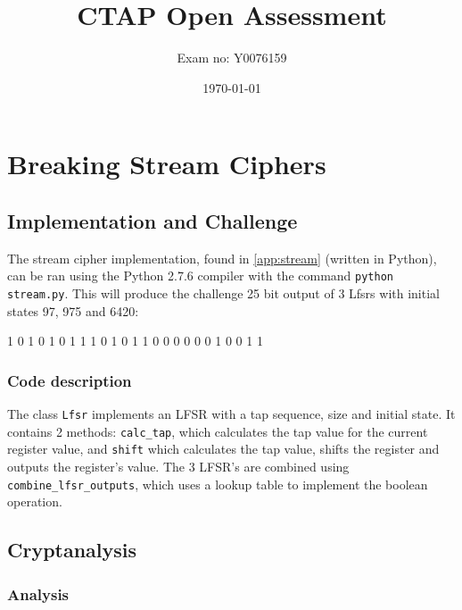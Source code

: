 \documentclass[british,10pt,a4paper]{article}
\begin{document}
\title{CTAP Open Assessment}
\author{Exam no: Y0076159}
\date{\today}
\maketitle
\tableofcontents
\clearpage
\section{Breaking Stream Ciphers}
\subsection{Implementation and Challenge}
The stream cipher implementation, found in \autoref{app:stream} (written in Python),
can be ran using the Python 2.7.6 compiler with the command \lstinline{python stream.py}. This will produce the
challenge 25 bit output of 3 Lfsrs with initial states 97, 975 and 6420:

1 0 1 0 1 0 1 1 1 0 1 0 1 1 0 0 0 0 0 0 1 0 0 1 1

\subsubsection{Code description}
The class \lstinline{Lfsr} implements an LFSR with a tap sequence, size and initial state. It contains 2 methods:
\lstinline{calc_tap}, which calculates the tap value for the current register value, and \lstinline{shift} which
calculates the tap value, shifts the register and outputs the register's value. The 3 LFSR's are combined using
\lstinline{combine_lfsr_outputs}, which uses a lookup table to implement the boolean operation.

\subsection{Cryptanalysis}
\subsubsection{Analysis}
\end{document}
